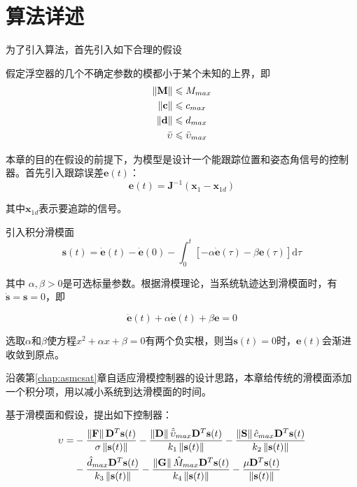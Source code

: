 \section{算法详述}

为了引入算法，首先引入如下合理的假设

\begin{ass}\label{4ass}
    假定浮空器的几个不确定参数的模都小于某个未知的上界，即
    \begin{eqnarray}
    \left\lVert\mathbf{M}\right\rVert &\leqslant M_{max} \\
    \left\lVert\mathbf{c}\right\rVert &\leqslant c_{max} \\
    \left\lVert\mathbf{d}\right\rVert &\leqslant d_{max} \\
    \bar{\upsilon} &\leqslant \bar{\upsilon}_{max} \\
    \end{eqnarray}
\end{ass}

本章的目的在假设的前提下，为模型是设计一个能跟踪位置和姿态角信号的控制器。首先引入跟踪误差$\mathbf{e}(t)$：
\begin{equation}\label{eq:errordef}
    \mathbf{e}(t)=\mathbf{J}^{-1}(\mathbf{x}_1-\mathbf{x}_{1d})
\end{equation}

其中$\mathbf{x}_{1d}$表示要追踪的信号。

引入积分滑模面
\begin{equation}\label{eq:slidingsurface}
\mathbf{s}(t)=\dot{\mathbf{e}}(t)-\dot{\mathbf{e}}(0)-\int_{0}^{t}[-\alpha\dot{\mathbf{e}}(\tau)-\beta\mathbf{e}(\tau)]\mathrm{d}\tau
\end{equation}

其中 $\alpha,\beta>0$是可选标量参数。根据滑模理论，当系统轨迹达到滑模面时，有$\dot{\mathbf{s}}=\mathbf{s}=0$，即

\begin{equation}
    \ddot{\mathbf{e}}(t)+\alpha\dot{\mathbf{e}}(t)+\beta\mathbf{e}=0
\end{equation}

选取$\alpha$和$\beta$使方程$x^2+\alpha x+\beta=0$有两个负实根，则当$\mathbf{s}(t)=0$时，$\mathbf{e}(t)$会渐进收敛到原点。

沿袭第\ref{chap:asmcsat}章自适应滑模控制器的设计思路，本章给传统的滑模面添加一个积分项，用以减小系统到达滑模面的时间。

基于滑模面和假设，提出如下控制器：
\begin{align}\label{eq:4controller}
\upsilon=&-\frac{\left\lVert\mathbf{F}\right\rVert\mathbf{D}^T\mathbf{s}(t)}{\sigma \left\lVert\mathbf{s}(t)\right\rVert}
-\frac{\left\lVert\mathbf{D}\right\rVert\hat{\bar{\upsilon}}_{max}\mathbf{D}^T\mathbf{s}(t)}{k_1 \left\lVert\mathbf{s}(t)\right\rVert}
-\frac{\left\lVert\mathbf{S}\right\rVert\hat{c}_{max}\mathbf{D}^T\mathbf{s}(t)}{k_2 \left\lVert\mathbf{s}(t)\right\rVert} \nonumber
\\&-\frac{\hat{d}_{max}\mathbf{D}^T\mathbf{s}(t)}{k_3 \left\lVert\mathbf{s}(t)\right\rVert}-\frac{\left\lVert\mathbf{G}\right\rVert\hat{M}_{max}\mathbf{D}^T\mathbf{s}(t)}{k_4 \left\lVert\mathbf{s}(t)\right\rVert}
-\frac{\mu\mathbf{D}^T\mathbf{s}(t)}{\left\lVert\mathbf{s}(t)\right\rVert}
\end{align}

